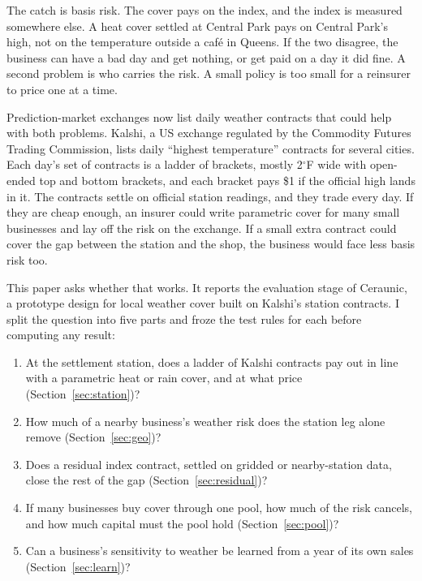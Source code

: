 \documentclass[11pt]{article}
\newcommand{\degF}{\ensuremath{^\circ}F}
\begin{document}
The catch is basis risk. The cover pays on the index, and the index is measured somewhere else. A heat cover settled at Central Park pays on Central Park's high, not on the temperature outside a café in Queens. If the two disagree, the business can have a bad day and get nothing, or get paid on a day it did fine. A second problem is who carries the risk. A small policy is too small for a reinsurer to price one at a time.

Prediction-market exchanges now list daily weather contracts that could help with both problems. Kalshi, a US exchange regulated by the Commodity Futures Trading Commission, lists daily ``highest temperature'' contracts for several cities. Each day's set of contracts is a ladder of brackets, mostly 2\degF{} wide with open-ended top and bottom brackets, and each bracket pays \$1 if the official high lands in it. The contracts settle on official station readings, and they trade every day. If they are cheap enough, an insurer could write parametric cover for many small businesses and lay off the risk on the exchange. If a small extra contract could cover the gap between the station and the shop, the business would face less basis risk too.

This paper asks whether that works. It reports the evaluation stage of Ceraunic, a prototype design for local weather cover built on Kalshi's station contracts. I split the question into five parts and froze the test rules for each before computing any result:
\begin{enumerate}
\item At the settlement station, does a ladder of Kalshi contracts pay out in line with a parametric heat or rain cover, and at what price (Section~\ref{sec:station})?
\item How much of a nearby business's weather risk does the station leg alone remove (Section~\ref{sec:geo})?
\item Does a residual index contract, settled on gridded or nearby-station data, close the rest of the gap (Section~\ref{sec:residual})?
\item If many businesses buy cover through one pool, how much of the risk cancels, and how much capital must the pool hold (Section~\ref{sec:pool})?
\item Can a business's sensitivity to weather be learned from a year of its own sales (Section~\ref{sec:learn})?
\end{enumerate}
\end{document}
